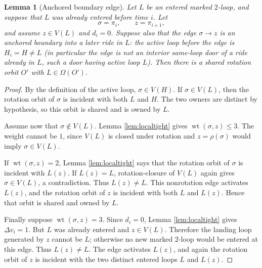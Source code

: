 \documentclass[11pt]{article}
\newtheorem{lemma}[theorem]{Lemma}
\DeclareMathOperator{\wt}{wt}
\begin{document}
\begin{lemma}[Anchored boundary edge]\label{lem:boundary}
Let \(L\) be an entered marked \(2\)-loop, and suppose that \(L\) was already entered before time
\(i\).  Let
\[
  \sigma=\pi_i,\qquad z=\pi_{i+1},
\]
and assume \(z\in V(L)\) and \(d_i=0\).  Suppose also that the edge
\(\sigma\to z\) is an anchored boundary into a later ride in \(L\): the active loop before the
edge is \(H_i=H\ne L\) (in particular the edge is not an interior same-loop door of a ride
already in \(L\), such a door having active loop \(L\)).
Then there is a shared rotation orbit \(O'\) with \(L\in\Omega(O')\).
\end{lemma}

\begin{proof}
By the definition of the active loop, \(\sigma\in V(H)\).
If \(\sigma\in V(L)\), then the rotation orbit of \(\sigma\) is incident with both \(L\) and
\(H\).  The two owners are distinct by hypothesis, so this orbit is shared and is owned by \(L\).

Assume now that \(\sigma\notin V(L)\).  Lemma \ref{lem:localtight} gives
\(\wt(\sigma,z)\le3\).  The weight cannot be \(1\), since \(V(L)\) is closed under rotation and
\(z=\rho(\sigma)\) would imply \(\sigma\in V(L)\).

If \(\wt(\sigma,z)=2\), Lemma \ref{lem:localtight} says that the rotation orbit of \(\sigma\)
is incident with \(L(z)\).  If \(L(z)=L\), rotation-closure of \(V(L)\) again gives
\(\sigma\in V(L)\), a contradiction.  Thus \(L(z)\ne L\).  This nonrotation edge activates
\(L(z)\), and the rotation orbit of \(z\) is incident with both \(L\) and \(L(z)\).  Hence
that orbit is shared and owned by \(L\).

Finally suppose \(\wt(\sigma,z)=3\).  Since \(d_i=0\), Lemma \ref{lem:localtight} gives
\(\Delta v_i=1\).  But \(L\) was already entered and \(z\in V(L)\).  Therefore the landing loop
generated by \(z\) cannot be \(L\); otherwise no new marked \(2\)-loop would be entered at this
edge.  Thus \(L(z)\ne L\).  The edge activates \(L(z)\), and again the rotation orbit of
\(z\) is incident with the two distinct entered loops \(L\) and \(L(z)\).
\end{proof}
\end{document}

